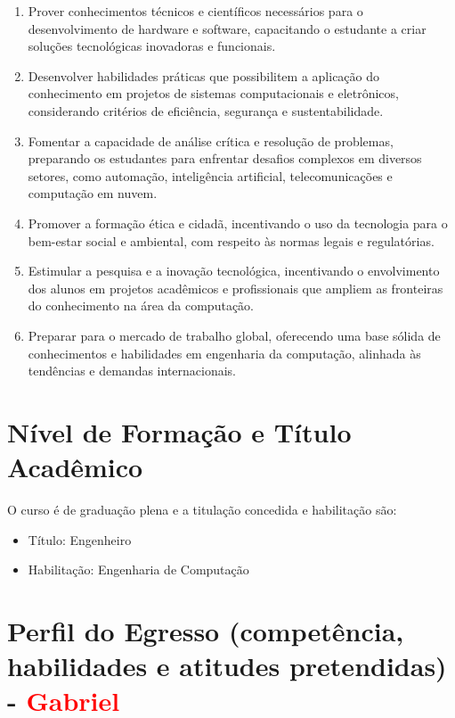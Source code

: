 \begin{enumerate}
  \item Prover conhecimentos técnicos e científicos necessários para o desenvolvimento de hardware e software, capacitando o estudante a criar soluções tecnológicas inovadoras e funcionais.

  \item Desenvolver habilidades práticas que possibilitem a aplicação do conhecimento em projetos de sistemas computacionais e eletrônicos, considerando critérios de eficiência, segurança e sustentabilidade.

  \item Fomentar a capacidade de análise crítica e resolução de problemas, preparando os estudantes para enfrentar desafios complexos em diversos setores, como automação, inteligência artificial, telecomunicações e computação em nuvem.

  \item Promover a formação ética e cidadã, incentivando o uso da tecnologia para o bem-estar social e ambiental, com respeito às normas legais e regulatórias.

  \item Estimular a pesquisa e a inovação tecnológica, incentivando o envolvimento dos alunos em projetos acadêmicos e profissionais que ampliem as fronteiras do conhecimento na área da computação.

  \item Preparar para o mercado de trabalho global, oferecendo uma base sólida de conhecimentos e habilidades em engenharia da computação, alinhada às tendências e demandas internacionais.

\end{enumerate}

\section{Nível de Formação e Título Acadêmico}

O curso é de graduação plena e a titulação concedida e habilitação são:

\begin{itemize}
  \item{Título: Engenheiro}
  \item{Habilitação: Engenharia de Computação}
\end{itemize}

\section{Perfil do Egresso (competência, habilidades e atitudes pretendidas) - \textcolor{red}{Gabriel}}

